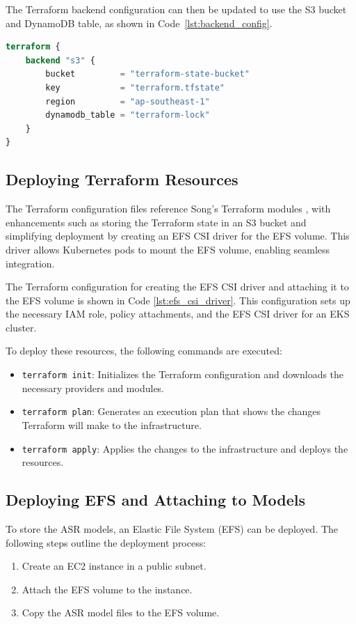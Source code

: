 The Terraform backend configuration can then be updated to use the S3 bucket and DynamoDB table, as shown in Code~\ref{lst:backend_config}.

\begin{lstlisting}[language=Terraform, caption={Terraform Backend Configuration}, label={lst:backend_config}]
terraform {
    backend "s3" {
        bucket         = "terraform-state-bucket"
        key            = "terraform.tfstate"
        region         = "ap-southeast-1"
        dynamodb_table = "terraform-lock"
    }
}
\end{lstlisting}

\subsection{Deploying Terraform Resources}
The Terraform configuration files reference Song's Terraform modules \cite{song_yu}, with enhancements such as storing the Terraform state in an S3 bucket and simplifying deployment by creating an EFS CSI driver for the EFS volume. This driver allows Kubernetes pods to mount the EFS volume, enabling seamless integration.

The Terraform configuration for creating the EFS CSI driver and attaching it to the EFS volume is shown in Code \ref{lst:efs_csi_driver}. This configuration sets up the necessary IAM role, policy attachments, and the EFS CSI driver for an EKS cluster.

To deploy these resources, the following commands are executed:
\begin{itemize}
    \item \texttt{terraform init}: Initializes the Terraform configuration and downloads the necessary providers and modules.
    \item \texttt{terraform plan}: Generates an execution plan that shows the changes Terraform will make to the infrastructure.
    \item \texttt{terraform apply}: Applies the changes to the infrastructure and deploys the resources.
\end{itemize}

\subsection{Deploying EFS and Attaching to Models}
To store the ASR models, an Elastic File System (EFS) can be deployed. The following steps outline the deployment process:
\begin{enumerate}
    \item Create an EC2 instance in a public subnet.
    \item Attach the EFS volume to the instance.
    \item Copy the ASR model files to the EFS volume.
\end{enumerate}


